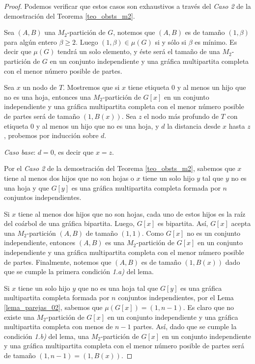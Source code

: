 \begin{proof}

Podemos verificar que estos casos son exhaustivos a través del \emph{Caso 2} de la demostración del Teorema \ref{teo_obsts_m2}. 

Sea $(A,B)$ una $M_2$-partición de $G$, notemos que $(A,B)$ es de tamaño $(1,\beta)$ para algún entero $\beta \geq 2$. Luego $(1,\beta)\in \mu(G)$ si y sólo si $\beta$ es mínimo. Es decir que $\mu(G)$ tendrá un solo elemento, y éste será el tamaño de una $M_2$-partición de $G$ en un conjunto independiente y una gráfica multipartita completa con el menor número posible de partes. 

Sea $x$ un nodo de $T$. Mostremos que si $x$ tiene etiqueta 0 y al menos un hijo que no es una hoja, entonces una $M_2$-partición de $G[x]$ en un conjunto independiente y una gráfica multipartita completa con el menor número posible de partes será de tamaño $(1,B(x))$. Sea $z$ el nodo más profundo de $T$ con etiqueta 0 y al menos un hijo que no es una hoja, y $d$ la distancia desde $x$ hasta $z$, probemos por inducción sobre $d$.

\emph{Caso base}: $d = 0$, es decir que $x = z$.

Por el \emph{Caso 2} de la demostración del Teorema \ref{teo_obsts_m2}, sabemos que $x$ tiene al menos dos hijos que no son hojas o $x$ tiene un solo hijo $y$ tal que $y$ no es una hoja y que $G[y]$ es una gráfica multipartita completa formada por $n$ conjuntos independientes. 

Si $x$ tiene al menos dos hijos que no son hojas, cada uno de estos hijos es la raíz del coárbol de una gráfica bipartita. Luego, $G[x]$ es bipartita. Así, $G[x]$ acepta una $M_2$-partición $(A,B)$ de tamaño $(1,1)$. Como $G[x]$ no es un conjunto independiente, entonces $(A,B)$ es una $M_2$-partición de $G[x]$ en un conjunto independiente y una gráfica multipartita completa con el menor número posible de partes. Finalmente, notemos que $(A,B)$ es de tamaño $(1,B(x))$ dado que se cumple la primera condición \emph{1.a)} del lema.

Si $x$ tiene un solo hijo $y$ que no es una hoja tal que $G[y]$ es una gráfica multipartita completa formada por $n$ conjuntos independientes, por el Lema \ref{lema_parejas_02}, sabemos que $\mu(G[x]) = (1,n-1)$. Es claro que no existe una $M_2$-partición de $G[x]$ en un conjunto independiente y una gráfica multipartita completa con menos de $n-1$ partes. Así, dado que se cumple la condición \emph{1.b)} del lema, una $M_2$-partición de $G[x]$ en un conjunto independiente y una gráfica multipartita completa con el menor número posible de partes será de tamaño $(1,n-1)=(1,B(x))$. 
 

\end{proof}
